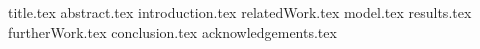 \documentclass[11pt]{llncs}
\begin{document}
{title.tex}
\thispagestyle{plain}
{abstract.tex}
{introduction.tex}
{relatedWork.tex}
{model.tex}
{results.tex}
{furtherWork.tex}
{conclusion.tex}
{acknowledgements.tex}

\end{document}
